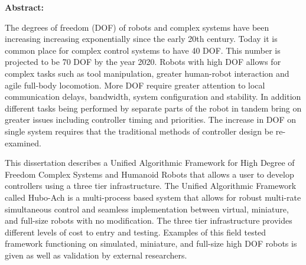 \begin{center}
\large\bf{Abstract:}
\end{center}
\normalsize

\bf{
\noindent The degrees of freedom (DOF) of robots and complex systems have been increasing increasing exponentially since the early 20th century.
Today it is common place for complex control systems to have 40 DOF. 
This number is projected to be 70 DOF by the year 2020.
Robots with high DOF allows for complex tasks such as tool manipulation, greater human-robot interaction and agile full-body locomotion.
More DOF require greater attention to local communication delays, bandwidth, system configuration and stability.
In addition different tasks being performed by separate parts of the robot in tandem bring on greater issues including controller timing and priorities.
The increase in DOF on single system requires that the traditional methods of controller design be re-examined.

\noindent This dissertation describes a Unified Algorithmic Framework for High Degree of Freedom Complex Systems and Humanoid Robots that allows a user to develop controllers using a three tier infrastructure.
The Unified Algorithmic Framework called Hubo-Ach is a multi-process based system that allows for robust multi-rate simultaneous control and seamless implementation between virtual, miniature, and full-size robots with no modification.
The three tier infrastructure provides different levels of cost to entry and testing.
Examples of this field tested framework functioning on simulated, miniature, and full-size high DOF robots is given as well as validation by external researchers.
}



